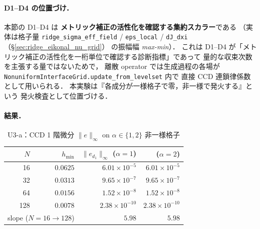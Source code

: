 \paragraph{D1--D4 の位置づけ．}
本節の D1--D4 は \textbf{メトリック補正の活性化を確認する集約スカラー}である
（実体は格子量 \texttt{ridge\_sigma\_eff\_field} /
\texttt{eps\_local} / \texttt{dJ\_dxi}（§\ref{sec:ridge_eikonal_nu_grid}）
の振幅幅 \textit{max-min}）．
これは D1--D4 が「メトリック補正の活性化を一桁単位で確認する診断指標」であって
量的な収束次数を主張する量ではないためで，
離散 operator では生成過程の各場が
\texttt{NonuniformInterfaceGrid.update\_from\_levelset} 内で
直接 CCD 連鎖律係数として用いられる．
本実験は『各成分が一様格子で零，非一様で発火する』という
発火検査として位置づける．

\paragraph{結果．}

\begin{table}[!ht]
\caption{U3-a：CCD 1 階微分 \texorpdfstring{$\|e\|_\infty$}{||e||_infinity} on \texorpdfstring{$\alpha\in\{1, 2\}$}{alpha in {1, 2}} 非一様格子}
\label{tab:U3_ccd_nonuniform}
\centering\small
\begin{tabular}{r r r r}
\toprule
$N$ & $h_{\min}$ & $\|e_{d_1}\|_\infty$ ($\alpha=1$) & ($\alpha=2$) \\
\midrule
16  & $0.0625$  & $6.01\times 10^{-5}$ & $6.01\times 10^{-5}$ \\
32  & $0.0313$  & $9.65\times 10^{-7}$ & $9.65\times 10^{-7}$ \\
64  & $0.0156$  & $1.52\times 10^{-8}$ & $1.52\times 10^{-8}$ \\
128 & $0.0078$  & $2.38\times 10^{-10}$ & $2.38\times 10^{-10}$ \\
\midrule
\multicolumn{2}{r}{slope ($N\!=\!16\!\to\!128$)} & $\mathbf{5.98}$ & $\mathbf{5.98}$ \\
\bottomrule
\end{tabular}
\end{table}

